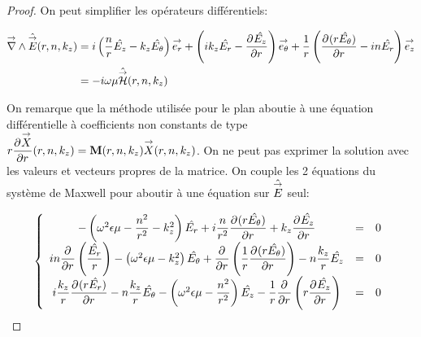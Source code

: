   \begin{proof}

    On peut simplifier les opérateurs différentiels:

    \begin{align}
      \vrot \hat \vE(r,n,k_z) &= i\left(\frac{n}{r}\hat{E_z} - k_z\hat{E_\theta}\right)\vect{e_r} +
      \left(ik_z\hat{E_r} - \ddr{r}{\hat{E_z}}\right)\vect{e_\theta} +
      \frac{1}{r}\left(\ddr{r}{(r\hat{E_\theta})}-in\hat{E_r}\right)\vect{e_z}
      \\
      &=-i\w\mu \hat \vH(r,n,k_z)
    \end{align}

    On remarque que la méthode utilisée pour le plan aboutie à une équation différentielle à coefficients non constants de type \(r\ddr{r}{\vect{X}}(r,n,k_z) = \mat{M}(r,n,k_z)\vect{X}(r,n,k_z)\).
    On ne peut pas exprimer la solution avec les valeurs et vecteurs propres de la matrice.
    On couple  les 2 équations du système de Maxwell pour aboutir à une équation sur \(\hat \vE\) seul:



    \begin{equation}
      \left\lbrace
      \begin{array}{ccc}
        -\left(\w^2\eps\mu -\frac{n^2}{r^2}  - k_z^2\right)\hat{E_r}  +i\frac{n}{r^2}\ddr{r}{(r\hat{E_\theta})}  +k_z\ddr{r}{\hat{E_z}} & = & 0\\
        in\ddr{r}{}\left(\frac{\hat{E_r}}{r}\right) -\left(\w^2\eps\mu - k_z^2\right)\hat{E_\theta} + \ddr{r}{}\left(\frac{1}{r}\ddr{r}{(r\hat{E_\theta})}\right)  - n\frac{k_z}{r}\hat{E_z} & = & 0\\
        i\frac{k_z}{r}\ddr{r}{(r\hat{E_r})}  - n\frac{k_z}{r}\hat{E_\theta}  -\left(\w^2\eps\mu - \frac{n^2}{r^2} \right)\hat{E_z} - \frac{1}{r}\ddr{r}{}\left(r\ddr{r}{\hat{E_z}}\right) & = & 0
      \end{array}
      \right.
    \end{equation}


\end{proof}
